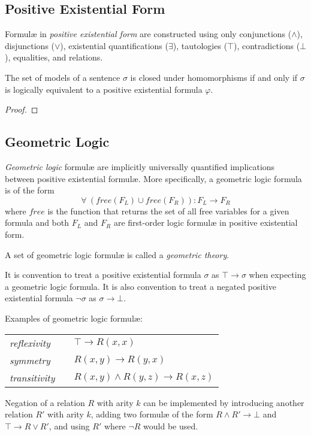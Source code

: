 	\subsection{Positive Existential Form}

		Formul{\ae} in \emph{positive existential form} are constructed using
		only conjunctions ($\wedge$), disjunctions ($\vee$), existential
		quantifications ($\exists$), tautologies ($\top$), contradictions
		($\bot$), equalities, and relations.

		\begin{theorem}
			The set of models of a sentence $\sigma$ is closed under homomorphisms
			if and only if $\sigma$ is logically equivalent to a positive
			existential formula $\varphi$.
		\end{theorem}

		\begin{proof}
			
		\end{proof}

	\subsection{Geometric Logic}

		\emph{Geometric logic} formul{\ae} are implicitly universally
		quantified implications between positive existential formul{\ae}. More
		specifically, a geometric logic formula is of the form
		\[\forall\ (free(F_L) \cup free(F_R)) : F_L \to F_R\]
		where $free$ is the function that returns the set of all free variables
		for a given formula and both $F_L$ and $F_R$ are first-order logic
		formul{\ae} in positive existential form.

		A set of geometric logic formul{\ae} is called a \emph{geometric
		theory}.

		It is convention to treat a positive existential formula $\sigma$ as
		$\top \to \sigma$ when expecting a geometric logic formula. It is also
		convention to treat a negated positive existential formula $\neg\sigma$
		as $\sigma \to \bot$.

		Examples of geometric logic formul{\ae}:

		\begin{tabular}{lll}
		\emph{reflexivity}   & \qquad  &  $\top \to R(x,x)$                  \\
		\emph{symmetry}      & \qquad  &  $R(x,y) \to R(y,x)$                \\
		\emph{transitivity}  & \qquad  &  $R(x,y) \wedge R(y,z) \to R(x,z)$
		\end{tabular}

		Negation of a relation $R$ with arity $k$ can be implemented by
		introducing another relation $R'$ with arity $k$, adding two
		formul{\ae} of the form $R \wedge R' \to \bot$ and $\top \to R \vee
		R'$, and using $R'$ where $\neg R$ would be used.

